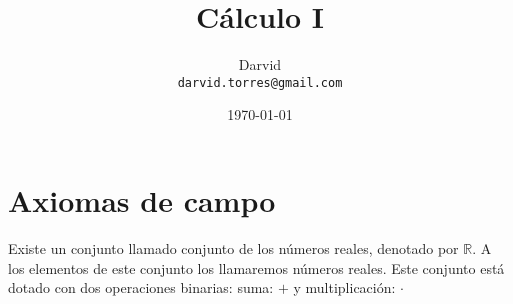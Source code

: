 \documentclass[11pt]{article}
\newcommand{\R}{\mathbb{R}}
\begin{document}
\title{Cálculo I}
\author{Darvid \\ \texttt{darvid.torres@gmail.com}}
\date{\today}
\maketitle
\thispagestyle{empty}

\part*{Axiomas de campo}

Existe un conjunto llamado conjunto de los números reales, denotado por $\R$. A los elementos de este conjunto los llamaremos números reales. Este conjunto está dotado con dos operaciones binarias: suma: $+$ y multiplicación: $\cdot$ 
%
%
%
\end{document}
